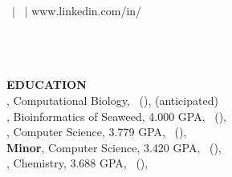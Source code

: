 \documentclass[10pt]{article}
\begin{document}

\Huge
\begin{center}
\textbf{\headingcolor{\Name\postNm
}}

		\large{
			\Phone \ $|$ 
			\Email \ $|$ 
			www.linkedin.com/in/\Usrnm\\ 
			\Postitle\\
		}
\normalsize
\headingcolor{\rule{\linewidth}{1pt}} 
\ \\
\ \\
\end{center}
\normalsize
\begin{flushleft}
\textbf{\headingcolor EDUCATION}\\
\PhD, Computational Biology, \PodunkU \ (\PodunkULoc),  (anticipated)\\
\Graduate, Bioinformatics of Seaweed, 4.000 GPA, 
\PodunkU \ (\PodunkULoc), \\
\MasterSci, Computer Science, 3.779 GPA, 
\PodunkU \ (\PodunkULoc),
\\
\textbf{Minor}, Computer Science, 3.420 GPA, \PodunkU \ (\PodunkULoc), %
\\
\BachelorSci, Chemistry, 3.688 GPA, \PodunkU \ (\PodunkULoc), 
\ \\
\ \\


\ \\




\end{flushleft}
\end{document}
